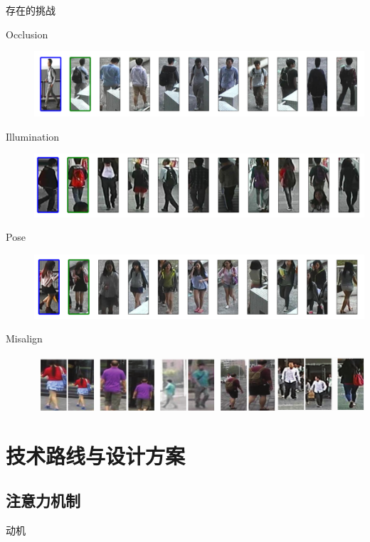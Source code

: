 \documentclass[notes]{beamer}
\begin{document}
\begin{frame}
	{存在的挑战}
	\begin{description}
		\item[Occlusion] \includegraphics[width=0.9\linewidth]{2018-03-12-10-09-03.png}
		\item[Illumination] \includegraphics[width=0.9\linewidth]{2018-03-12-10-10-10.png}
		\item[Pose] \includegraphics[width=0.9\linewidth]{2018-03-12-10-10-18.png}
		\item[Misalign] \includegraphics[width=0.88\linewidth]{2018-03-07-20-16-25.png}
	\end{description}
	
\end{frame}

\section{技术路线与设计方案}

\subsection{注意力机制}

\begin{frame}{动机}
	
\end{frame}
\end{document}

